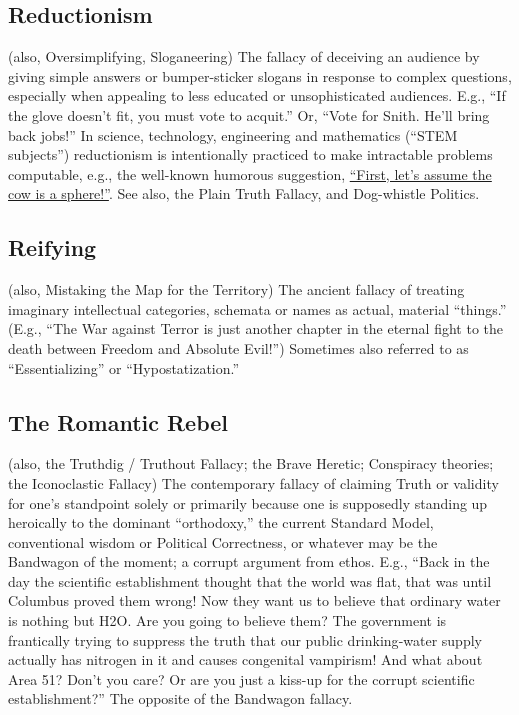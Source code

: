 \documentclass[10pt,a4paper,british]{article}
\begin{document}
\begin{multicols}{2}
    \subsection{Reductionism} (also, Oversimplifying, Sloganeering) The fallacy of deceiving an audience by giving simple answers or bumper{-}sticker slogans in response to complex questions, especially when appealing to less educated or unsophisticated audiences. E.g., ``If the glove doesn’t fit, you must vote to acquit.'' Or, ``Vote for Snith. He'll bring back jobs!'' In science, technology, engineering and mathematics (``STEM subjects'') reductionism is intentionally practiced to make intractable problems computable, e.g., the well{-}known humorous suggestion, \href{https://www.wired.com/2011/02/what-is-up-with-the-spherical-cow/}{``First, let's assume the cow is a sphere!''}. See also, the Plain Truth Fallacy, and Dog{-}whistle Politics.  

    \subsection{Reifying} (also, Mistaking the Map for the Territory) The ancient fallacy of treating imaginary intellectual categories, schemata or names as actual, material ``things.'' (E.g., ``The War against Terror is just another chapter in the eternal fight to the death between Freedom and Absolute Evil!'') Sometimes also referred to as ``Essentializing'' or “Hypostatization.” 

    \subsection{The Romantic Rebel} (also, the Truthdig / Truthout Fallacy; the Brave Heretic; Conspiracy theories; the Iconoclastic Fallacy) The contemporary fallacy of claiming Truth or validity for one's standpoint solely or primarily because one is supposedly standing up heroically to the dominant ``orthodoxy,'' the current Standard Model, conventional wisdom or Political Correctness, or whatever may be the Bandwagon of the moment; a corrupt argument from ethos. E.g., ``Back in the day the scientific establishment thought that the world was flat, that was until Columbus proved them wrong!  Now they want us to believe that ordinary water is nothing but H2O. Are you going to believe them? The government is frantically trying to suppress the truth that our public drinking{-}water supply actually has nitrogen in it and causes congenital vampirism! And what about Area 51? Don't you care? Or are you just a kiss{-}up for the corrupt scientific establishment?'' The opposite of the Bandwagon fallacy.  


\end{multicols}
\end{document}
